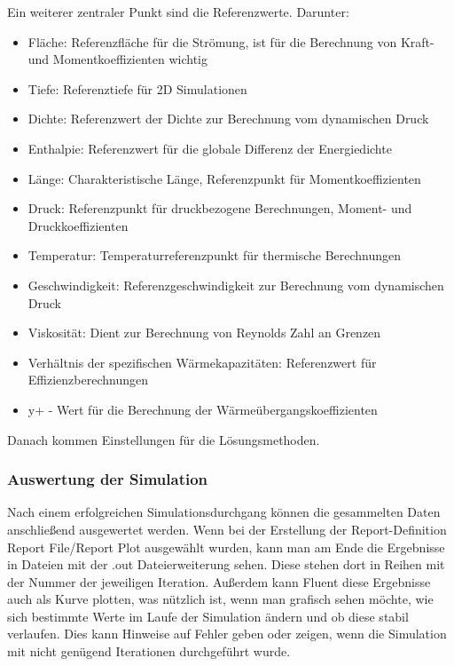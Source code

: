 Ein weiterer zentraler Punkt sind die Referenzwerte. Darunter:
\vspace{0.5cm}
\begin{itemize}
    \item Fläche: Referenzfläche für die Strömung, ist für die Berechnung von Kraft- und Momentkoeffizienten wichtig
    \item Tiefe: Referenztiefe für 2D Simulationen
    \item Dichte: Referenzwert der Dichte zur Berechnung vom dynamischen Druck
    \item Enthalpie: Referenzwert für die globale Differenz der Energiedichte
    \item Länge: Charakteristische Länge, Referenzpunkt für Momentkoeffizienten
    \item Druck: Referenzpunkt für druckbezogene Berechnungen, Moment- und Druckkoeffizienten
    \item Temperatur: Temperaturreferenzpunkt für thermische Berechnungen
    \item Geschwindigkeit: Referenzgeschwindigkeit zur Berechnung vom dynamischen Druck
    \item Viskosität: Dient zur Berechnung von Reynolds Zahl an Grenzen
    \item Verhältnis der spezifischen Wärmekapazitäten: Referenzwert für Effizienzberechnungen
    \item y+ - Wert für die Berechnung der Wärmeübergangskoeffizienten
\end{itemize}
\vspace{0.5cm}
Danach kommen Einstellungen für die Lösungsmethoden. 

\subsubsection*{Auswertung der Simulation}
\label{subsubsec:simulation_postprossesing}
Nach einem erfolgreichen Simulationsdurchgang können die gesammelten Daten anschließend ausgewertet werden. Wenn bei der Erstellung der Report-Definition Report File/Report Plot ausgewählt wurden, kann man am Ende die Ergebnisse in Dateien mit der .out Dateierweiterung sehen. Diese stehen dort in Reihen mit der Nummer der jeweiligen Iteration. Außerdem kann Fluent diese Ergebnisse auch als Kurve plotten, was nützlich ist, wenn man grafisch sehen möchte, wie sich bestimmte Werte im Laufe der Simulation ändern und ob diese stabil verlaufen. Dies kann Hinweise auf Fehler geben oder zeigen, wenn die Simulation mit nicht genügend Iterationen durchgeführt wurde.

